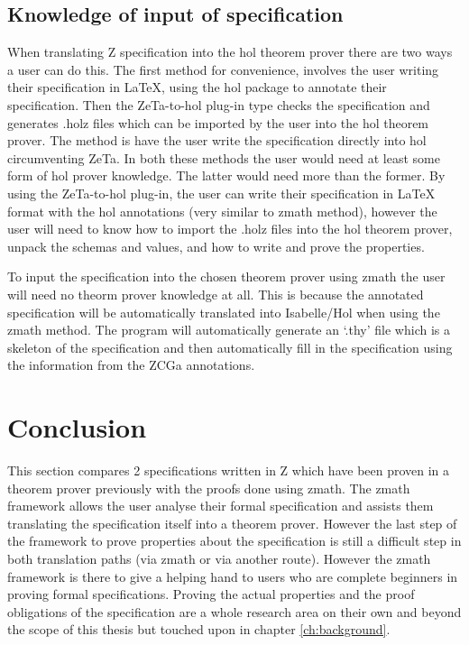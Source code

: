 \subsection{Knowledge of input of specification}
\label{knowledgeofinputforbb}

When translating Z specification into the \gls{hol} theorem prover there are two ways a user can do this. The first method for convenience, involves the user writing their specification in \LaTeX{}, using the \gls{hol} package to annotate their specification. Then the ZeTa-to-\gls{hol} plug-in type checks the specification and generates .holz files which can be imported by the user into the \gls{hol} theorem prover. The method is have the user write the specification directly into \gls{hol} circumventing ZeTa.
In both these methods the user would need at least some form of \gls{hol} prover knowledge. The latter would need more than the former. By using the ZeTa-to-\gls{hol} plug-in, the user can write their specification in \LaTeX{} format with the \gls{hol} annotations (very similar to \gls{zmath} method), however the user will need to know how to import the .holz files into the \gls{hol} theorem prover, unpack the schemas and values, and how to write and prove the properties. 

To input the specification into the chosen theorem prover using \gls{zmath} the user will need no theorm prover knowledge at all. This is because the annotated specification will be automatically translated into Isabelle/Hol when using the \gls{zmath} method. The program will automatically generate an `.thy' file which is a skeleton of the specification and then automatically fill in the specification using the information from the ZCGa annotations.

\section{Conclusion}
This section compares 2 specifications written in Z which have been proven in a theorem prover previously with the proofs done using \gls{zmath}. The \gls{zmath} framework allows the user analyse their formal specification and assists them translating the specification itself into a theorem prover. However the last step of the framework to prove properties about the specification is still a difficult step in both translation paths (via \gls{zmath} or via another route). However the \gls{zmath} framework is there to give a helping hand to users who are complete beginners in proving formal specifications. Proving the actual properties and the proof obligations of the specification are a whole research area on their own and beyond the scope of this thesis but touched upon in chapter \ref{ch:background}.

